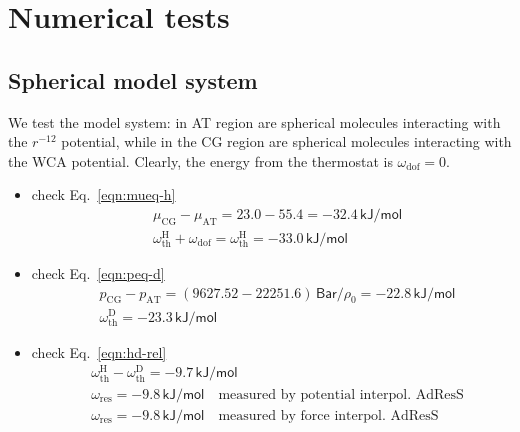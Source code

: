\documentclass[aip,jcp,a4paper,reprint,onecolumn]{revtex4-1}
\newcommand{\AT}{{\textrm{{AT}}}}
\newcommand{\CG}{{\textrm{CG}}}
\newcommand{\thf}{{\textrm{th}}}
\newcommand{\dof}{{\textrm{dof}}}
\newcommand{\res}{{\textrm{res}}}
\newcommand{\hadress}{{\textrm{H}}}
\newcommand{\dadress}{{\textrm{D}}}
\begin{document}
\section{Numerical tests}

\subsection {Spherical model system}
We test the model system: in AT region are spherical molecules
interacting with the $r^{-12}$ potential, while in the CG region are
spherical molecules interacting with the WCA potential. Clearly,
the energy from the thermostat is $\omega_\dof = 0$.
\begin{itemize}
\item check Eq.~\eqref{eqn:mueq-h}
  \begin{align}
  &\mu_\CG - \mu_\AT = 23.0 - 55.4 = -32.4 \,\textsf{kJ/mol}\\
  &\omega^\hadress_\thf + \omega_\dof = \omega^\hadress_\thf= -33.0  \,\textsf{kJ/mol}
  \end{align}
\item check Eq.~\eqref{eqn:peq-d}
  \begin{align}
    &p_\CG - p_\AT = (9627.52 - 22251.6) \,\textsf{Bar} / \rho_0 = - 22.8  \,\textsf{kJ/mol} \\
    &\omega^\dadress_\thf = - 23.3  \,\textsf{kJ/mol}
  \end{align}
\item check Eq.~\eqref{eqn:hd-rel}
  \begin{align}
    &\omega^\hadress_\thf - \omega^\dadress_\thf = -9.7 \,\textsf{kJ/mol}\\
    &\omega_\res = -9.8 \,\textsf{kJ/mol} \quad \textrm{measured by potential interpol. AdResS}\\
    &\omega_\res = -9.8 \,\textsf{kJ/mol} \quad \textrm{measured by force interpol. AdResS}
  \end{align}
\end{itemize}
\end{document}
